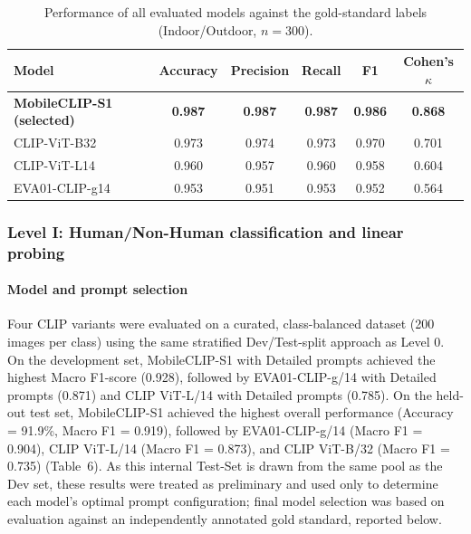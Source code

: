 \documentclass[hidelinks, 11pt]{article}
\begin{document}
\begin{table}[htbp]
\centering
\caption{Performance of all evaluated models against the gold-standard labels (Indoor/Outdoor, $n=300$).}
\label{tab:gold_standard_validation_indooroutdoor}
\begin{tabular}{@{}lccccc@{}}
\toprule
\textbf{Model} & \textbf{Accuracy} & \textbf{Precision} & \textbf{Recall} & \textbf{F1} & \textbf{Cohen's $\kappa$} \\
\midrule
\textbf{MobileCLIP-S1 (selected)} & \textbf{0.987} & \textbf{0.987} & \textbf{0.987} & \textbf{0.986} & \textbf{0.868} \\
CLIP-ViT-B32              & 0.973 & 0.974 & 0.973 & 0.970 & 0.701 \\
CLIP-ViT-L14              & 0.960 & 0.957 & 0.960 & 0.958 & 0.604 \\
EVA01-CLIP-g14            & 0.953 & 0.951 & 0.953 & 0.952 & 0.564 \\
\bottomrule
\end{tabular}
\end{table}


\subsubsection{Level I: Human/Non-Human classification and linear probing}


\paragraph{Model and prompt selection}
Four CLIP variants were evaluated on a curated, class-balanced dataset (200 images per class) using the same stratified Dev/Test-split approach as Level 0. On the development set, MobileCLIP-S1 with Detailed prompts achieved the highest Macro F1-score (0.928), followed by EVA01-CLIP-g/14 with Detailed prompts (0.871) and CLIP ViT-L/14 with Detailed prompts (0.785). On the held-out test set, MobileCLIP-S1 achieved the highest overall performance (Accuracy = 91.9\%, Macro F1 = 0.919), followed by EVA01-CLIP-g/14 (Macro F1 = 0.904), CLIP ViT-L/14 (Macro F1 = 0.873), and CLIP ViT-B/32 (Macro F1 = 0.735) (Table~6). As this internal Test-Set is drawn from the same pool as the Dev set, these results were treated as preliminary and used only to determine each model's optimal prompt configuration; final model selection was based on evaluation against an independently annotated gold standard, reported
below.
\end{document}
